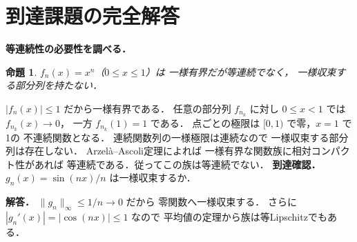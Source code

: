 \documentclass[a5paper,10pt,onecolumn]{jsarticle}
\makeatletter
\theoremstyle{mathnotetheorem}
\newtheorem{proposition}[theorem]{命題}
\renewcommand{\proofname}{証明}
\renewenvironment{proof}[1][\proofname]{%
  \par\pushQED{\qed}\normalfont\topsep4\p@\@plus2\p@\relax
  \trivlist\item[\hskip\labelsep\bfseries #1]\ignorespaces
}{\popQED\endtrivlist\@endpefalse}
\makeatother
\begin{document}
\section{到達課題の完全解答}
\noindent\textbf{等連続性の必要性を調べる．}
\begin{proposition}
$f_n(x)=x^n$（$0\le x\le1$）は
一様有界だが等連続でなく，
一様収束する部分列を持たない．
\end{proposition}
\begin{proof}
$|f_n(x)|\le1$ だから一様有界である．
任意の部分列 $f_{n_k}$ に対し
$0\le x<1$ では $f_{n_k}(x)\to0$，
一方 $f_{n_k}(1)=1$ である．
点ごとの極限は $[0,1)$ で零，$x=1$ で1の
不連続関数となる．
連続関数列の一様極限は連続なので
一様収束する部分列は存在しない．
Arzelà--Ascoli定理によれば
一様有界な関数族に相対コンパクト性があれば
等連続である．従ってこの族は等連続でない．
\end{proof}
\noindent\textbf{到達確認．}
$g_n(x)=\sin(nx)/n$ は一様収束するか．
\par\noindent\textbf{解答．}
$\|g_n\|_\infty\le1/n\to0$ だから
零関数へ一様収束する．
さらに $|g_n'(x)|=|\cos(nx)|\le1$ なので
平均値の定理から族は等Lipschitzでもある．
\end{document}
